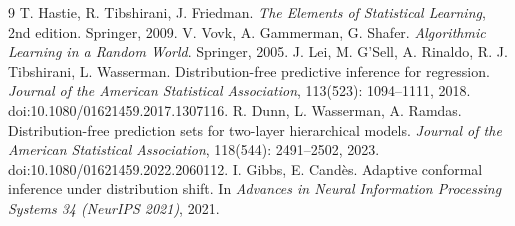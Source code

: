\begin{thebibliography}{9}
 T. Hastie, R. Tibshirani, J. Friedman. \emph{The Elements of Statistical Learning}, 2nd edition. Springer, 2009.
 V. Vovk, A. Gammerman, G. Shafer. \emph{Algorithmic Learning in a Random World}. Springer, 2005.
 J. Lei, M. G'Sell, A. Rinaldo, R. J. Tibshirani, L. Wasserman. Distribution-free predictive inference for regression. \emph{Journal of the American Statistical Association}, 113(523): 1094--1111, 2018. doi:10.1080/01621459.2017.1307116.
 R. Dunn, L. Wasserman, A. Ramdas. Distribution-free prediction sets for two-layer hierarchical models. \emph{Journal of the American Statistical Association}, 118(544): 2491--2502, 2023. doi:10.1080/01621459.2022.2060112.
 I. Gibbs, E. Candès. Adaptive conformal inference under distribution shift. In \emph{Advances in Neural Information Processing Systems 34 (NeurIPS 2021)}, 2021.
\end{thebibliography}

